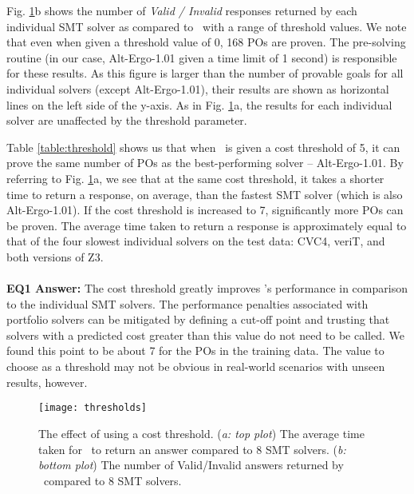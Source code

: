 Fig. \ref{fig:thresholds}b shows the number of \textit{Valid / Invalid} responses returned by each individual SMT solver as compared to \where~with a range of threshold values.
We note that even when given a threshold value of 0, 168 POs are proven.
The pre-solving routine (in our case, Alt-Ergo-1.01 given a time limit of 1 second) is responsible for these results.
As this figure is larger than the number of provable goals for all individual solvers (except Alt-Ergo-1.01), their results are shown as horizontal lines on the left side of the y-axis.
As in Fig. \ref{fig:thresholds}a, the results for each individual solver are unaffected by the threshold parameter.

Table \ref{table:threshold} shows us that when \where~is given a cost threshold of 5, it can prove the same number of POs as the best-performing solver -- Alt-Ergo-1.01. 
By referring to Fig. \ref{fig:thresholds}a, we see that at the same cost threshold, it takes a shorter time to return a response, on average, than the fastest SMT solver (which is also Alt-Ergo-1.01).
If the cost threshold is increased to 7, significantly more POs can be proven. 
The average time taken to return a response is approximately equal to that of the four slowest individual solvers on the test data: CVC4, veriT, and both versions of Z3. \\
\\
\textbf{EQ1 Answer:} The cost threshold greatly improves \where's performance in comparison to the individual SMT solvers.
The performance penalties associated with portfolio solvers can be mitigated by defining a cut-off point and trusting that solvers with a predicted cost greater than this value do not need to be called.
We found this point to be about 7 for the POs in the training data.
The value to choose as a threshold may not be obvious in real-world scenarios with unseen results, however. 

\begin{figure}
	\centering
	\texttt{[image: thresholds]}
	\caption[The effect of using a cost threshold]{The effect of using a cost threshold. (\textit{a: top plot}) The average time taken for \where~to return an answer compared to 8 SMT solvers. (\textit{b: bottom plot}) The number of Valid/Invalid answers returned by \where~compared to 8 SMT solvers.}
	\label{fig:thresholds}
\end{figure}


